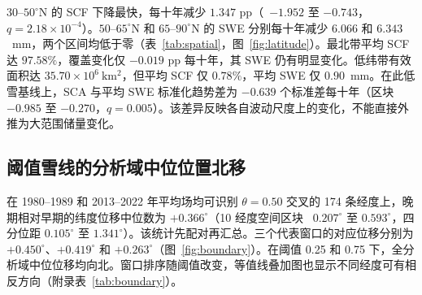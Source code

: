 $30$--$50^\circ$N 的 SCF 下降最快，每十年减少 $1.347$ pp（\CI\ $-1.952$ 至 $-0.743$，$q=2.18\times10^{-4}$）。$50$--$65^\circ$N 和 $65$--$90^\circ$N 的 SWE 分别每十年减少 $6.066$ 和 $6.343$~mm，两个区间均低于零（表~\ref{tab:spatial}，图~\ref{fig:latitude}）。最北带平均 SCF 达 $97.58\%$，覆盖变化仅 $-0.019$ pp 每十年，其 SWE 仍有明显变化。低纬带有效面积达 $35.70\times10^6~\mathrm{km^2}$，但平均 SCF 仅 $0.78\%$，平均 SWE 仅 $0.90$~mm。在此低雪基线上，SCA 与平均 SWE 标准化趋势差为 $-0.639$ 个标准差每十年（区块 \CI\ $-0.985$ 至 $-0.270$，$q=0.005$）。该差异反映各自波动尺度上的变化，不能直接外推为大范围储量变化。

\begin{table}[!htbp]\centering\small
\caption{\textbf{代表窗口与纬度带的有效面积和冬季趋势。} 每组 $n=43$，时期为 1980--2022 年 DJF。斜率单位均为每十年，方括号内为 HAC(3) 95\% CI。窗口内面积按固定有效格点计算。组内校正结果和斜率对比见源数据。}\label{tab:spatial}
\setlength{\tabcolsep}{4pt}

\end{table}


\subsection{阈值雪线的分析域中位位置北移}

在 1980--1989 和 2013--2022 年平均场均可识别 $\theta=0.50$ 交叉的 174 条经度上，晚期相对早期的纬度位移中位数为 $+0.366^\circ$（10 经度空间区块 \CI\ $0.207^\circ$ 至 $0.593^\circ$，四分位距 $0.105^\circ$ 至 $1.341^\circ$）。该统计先配对再汇总。三个代表窗口的对应位移分别为 $+0.450^\circ$、$+0.419^\circ$ 和 $+0.263^\circ$（图~\ref{fig:boundary}）。在阈值 0.25 和 0.75 下，全分析域中位位移均向北。窗口排序随阈值改变，等值线叠加图也显示不同经度可有相反方向（附录表~\ref{tab:boundary}）。


